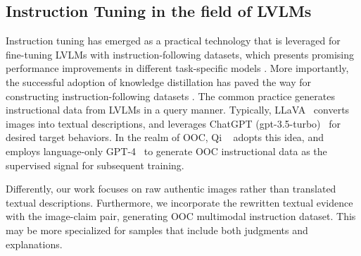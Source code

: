 \subsection{Instruction Tuning in the field of LVLMs}
Instruction tuning has emerged as a practical technology that is leveraged for fine-tuning LVLMs with instruction-following datasets, which presents promising performance improvements in different task-specific models \cite{zhang2023aligning, chen2024lion, jin2024llava}. More importantly, the successful adoption of knowledge distillation has paved the way for constructing instruction-following datasets \cite{yang2024gpt4tools, wang2024mmidr, kuckreja2024geochat}. The common practice generates instructional data from LVLMs in a query manner. Typically, LLaVA~\cite{dai2023instructblip} converts images into textual descriptions, and leverages ChatGPT (gpt-3.5-turbo)~\cite{ouyang2022training} for desired target behaviors. In the realm of OOC, Qi \etal~\cite{qi2024sniffer} adopts this idea, and employs language-only GPT-4~\cite{achiam2023gpt} to generate OOC instructional data as the supervised signal for subsequent training.

Differently, our work focuses on raw authentic images rather than translated textual descriptions. Furthermore, we incorporate the rewritten textual evidence with the image-claim pair, generating OOC multimodal instruction dataset. This may be more specialized for samples that include both judgments and explanations.
